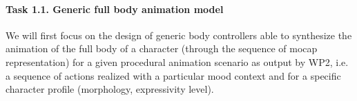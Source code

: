 

% 


\paragraph{Task 1.1. Generic full body animation model}

We will first focus on the design of generic body controllers able to synthesize the animation of the full body of a character (through the sequence of mocap representation) for a given procedural animation scenario as output by WP2, i.e. a sequence of actions realized with a particular mood context and for a specific character profile (morphology, expressivity level). 

